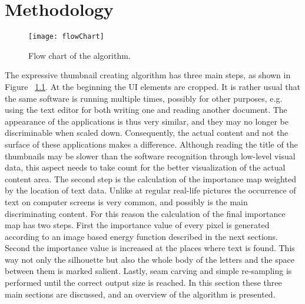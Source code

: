 \documentclass[draft,final]{vutinfth} %
\begin{document}
	\chapter{Methodology}
	\begin{figure}
		\centering		
		\texttt{[image: flowChart]}
		\caption{Flow chart of the algorithm.}
		\label{fig:flowChart}
	\end{figure}
	The expressive thumbnail creating algorithm has three main steps, as shown in Figure ~\ref{fig:flowChart}.
	At the beginning the UI elements are cropped.
	It is rather usual that the same software is running multiple times, possibly for other purposes, e.g. using the text editor for both writing one and reading another document.
	The appearance of the applications is thus very similar, and they may no longer be discriminable when scaled down.  
	Consequently, the actual content and not the surface of these applications makes a difference.
	Although reading the title of the thumbnails may be slower than the software recognition through low-level visual data, this aspect needs to take count for the better visualization of the actual content area.%
	The second step is the calculation of the importance map weighted by the location of text data.
	Unlike at regular real-life pictures the occurrence of text on computer screens is very common, and possibly is the main discriminating content.
	For this reason the calculation of the final importance map has two steps.
	First the importance value of every pixel is generated according to an image based energy function described in the next sections.
	Second the importance value is increased at the places where text is found.
	This way not only the silhouette but also the whole body of the letters and the space between them is marked salient. 
	Lastly, seam carving and simple re-sampling is performed  until the correct output size is reached.
	In this section these three main sections are discussed, and an overview of the algorithm is presented.	
	
\end{document}
